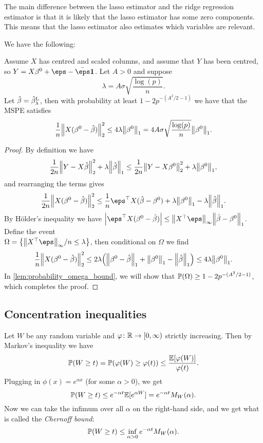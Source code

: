 The main difference between the lasso estimator and the ridge regression estimator is that it is likely that the lasso estimator has some zero components. This means that the lasso estimator also estimates which variables are relevant. 

We have the following:
\begin{theorem}
	Assume $X$ has centred and scaled columns, and assume that $Y$ has been centred, so $Y = X\beta^0 + \eps - \bar\eps \vec 1$. Let $A > 0$ and suppose
	\[
	\lambda = A\sigma\sqrt{\frac{\log(p)}{n}}.
	\]
	Let $\hat\beta = \hat\beta_\lambda^\mathrm{L}$, then with probability at least $1 - 2p^{-(A^2/2 - 1)}$ we have that the MSPE satisfies
	\[
	\frac1n \norm{X(\beta^0 - \hat\beta)}_2^2 \leq 4\lambda \norm{\beta^0}_1 = 4A\sigma\sqrt{\frac{\log(p)}{n}} \norm{\beta^0}_1. 
	\]
\end{theorem}

\begin{proof}
	By definition we have
	\[
	\frac1{2n}\norm{Y - X\hat\beta }_2^2 + \lambda \norm{\hat \beta}_1 \leq \frac1{2n}\norm{Y - X\beta^0}_2^2 + \lambda \norm{\beta^0}_1,
	\]
	and rearranging the terms gives
	\[
	\frac1{2n} \norm{X(\beta^0 - \hat\beta)}_2^2 \leq\frac1n \eps\T X (\hat\beta - \beta^0) + \lambda\norm{\beta^0}_1 - \lambda \norm{\hat\beta}_1. 
	\]
	By H\"older's inequality we have $\abs{\eps\T X(\beta^0 - \hat\beta)} \leq \norm{X\T\eps}_\infty \norm{\hat\beta - \beta^0}_1$. 
	Define the event \\ $\Omega = \qty{\norm{X\T\eps}_\infty/n \leq \lambda}$, then conditional on $\Omega$ we find
	\[
	\frac1{n} \norm{X(\beta^0 - \hat\beta)}_2^2 \leq 2\lambda \qty(\norm{\beta^0 - \hat\beta}_1 + \norm{\beta^0}_1 - \norm{\hat\beta}_1) \leq 4\lambda \norm{\beta^0}_1.
	\]
	In \cref{lem:probability_omega_bound}, we will show that $\mathbb P(\Omega) \geq 1 - 2p^{-(A^2/2 - 1)}$, which completes the proof. 
\end{proof}

\subsection{Concentration inequalities}
Let $W$ be any random variable and $\varphi \colon \mathbb R\to[0,\infty)$ strictly increasing. Then by Markov's inequality we have
\[
\mathbb P(W \geq t) = \mathbb P(\varphi(W) \geq \varphi(t)) \leq \frac{\mathbb E[\varphi(W)]}{\varphi(t)}. 
\]
Plugging in $\phi(x) = e^{\alpha x}$ (for some $\alpha > 0$), we get
\[
\mathbb P(W \geq t) \leq e^{-\alpha t} \mathbb E[e^{\alpha W}] = e^{-\alpha t} M_W(\alpha).
\]
Now we can take the infimum over all $\alpha$ on the right-hand side, and we get what is called the \emph{Chernoff bound}:
\[
\mathbb P(W \geq t) \leq \inf_{\alpha > 0} e^{-\alpha t} M_W(\alpha). 
\]

